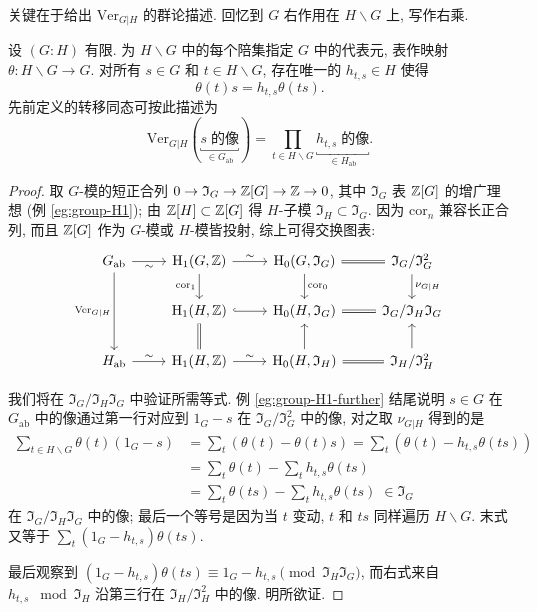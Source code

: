 关键在于给出 $\mathrm{Ver}_{G|H}$ 的群论描述. 回忆到 $G$ 右作用在 $H \backslash G$ 上, 写作右乘.

\begin{proposition}
	设 $(G:H)$ 有限. 为 $H \backslash G$ 中的每个陪集指定 $G$ 中的代表元, 表作映射 $\theta: H \backslash G \to G$. 对所有 $s \in G$ 和 $t \in H \backslash G$, 存在唯一的 $h_{t, s} \in H$ 使得
	\[ \theta(t)s = h_{t, s} \theta(ts). \]
	先前定义的转移同态可按此描述为
	\[ \mathrm{Ver}_{G|H}(\underbracket{s\;\text{的像}}_{\in G_{\mathrm{ab}}}) = \prod_{t \in H \backslash G} \underbracket{h_{t, s}\;\text{的像}}_{\in H_{\mathrm{ab}}}. \]
\end{proposition}
\begin{proof}
	取 $G$-模的短正合列 $0 \to \mathfrak{I}_G \to \mathbb{Z}[G] \to \mathbb{Z} \to 0$, 其中 $\mathfrak{I}_G$ 表 $\mathbb{Z}[G]$ 的增广理想 (例 \ref{eg:group-H1}); 由 $\mathbb{Z}[H] \subset \mathbb{Z}[G]$ 得 $H$-子模 $\mathfrak{I}_H \subset \mathfrak{I}_G$. 因为 $\mathrm{cor}_n$ 兼容长正合列, 而且 $\mathbb{Z}[G]$ 作为 $G$-模或 $H$-模皆投射, 综上可得交换图表:
	\[\begin{tikzcd}
		G_{\mathrm{ab}} \arrow[r, "\sim"'] \arrow[dd, "{\mathrm{Ver}_{G|H}}"'] &
		\Hm_1(G, \Z) \arrow[d, "{\mathrm{cor}_1}"'] \arrow[r, "\sim"] & \Hm_0(G, \mathfrak{I}_G) \arrow[d, "{\mathrm{cor}_0}"] \arrow[equal, r] &  \mathfrak{I}_G/\mathfrak{I}_G^2 \arrow[d, "{\nu_{G|H}}"] \\
		& \Hm_1(H, \Z) \arrow[equal, d] \arrow[hookrightarrow, r] & \Hm_0(H, \mathfrak{I}_G) \arrow[equal, r] & \mathfrak{I}_G / \mathfrak{I}_H \mathfrak{I}_G \\
		H_{\mathrm{ab}} \arrow[r, "\sim"] & \Hm_1(H, \Z) \arrow[r, "\sim"] & \Hm_0(H, \mathfrak{I}_H) \arrow[equal, r] \arrow[u] & \mathfrak{I}_H / \mathfrak{I}_H^2 \arrow[u]
	\end{tikzcd}\]

	我们将在 $\mathfrak{I}_G / \mathfrak{I}_H \mathfrak{I}_G$ 中验证所需等式. 例 \ref{eg:group-H1-further} 结尾说明 $s \in G$ 在 $G_{\mathrm{ab}}$ 中的像通过第一行对应到 $1_G - s$ 在 $\mathfrak{I}_G/\mathfrak{I}_G^2$ 中的像, 对之取 $\nu_{G|H}$ 得到的是
	\begin{align*}
		\sum_{t \in H \backslash G} \theta(t)(1_G - s) & = \sum_t (\theta(t) - \theta(t)s) = \sum_t (\theta(t) - h_{t, s}\theta(ts)) \\
		& = \sum_t \theta(t) - \sum_t h_{t, s} \theta(ts) \\
		& = \sum_t \theta(ts) - \sum_t h_{t, s} \theta(ts) \;\in \mathfrak{I}_G
	\end{align*}
	在 $\mathfrak{I}_G / \mathfrak{I}_H \mathfrak{I}_G$ 中的像; 最后一个等号是因为当 $t$ 变动, $t$ 和 $ts$ 同样遍历 $H \backslash G$. 末式又等于 $\sum_t (1_G - h_{t, s}) \theta(ts)$.
	
	最后观察到 $(1_G - h_{t, s}) \theta(ts) \equiv 1_G - h_{t, s} \pmod{\mathfrak{I}_H \mathfrak{I}_G}$, 而右式来自 $h_{t, s} \; \bmod \mathfrak{I}_H$ 沿第三行在 $\mathfrak{I}_H / \mathfrak{I}_H^2$ 中的像. 明所欲证.
\end{proof}

